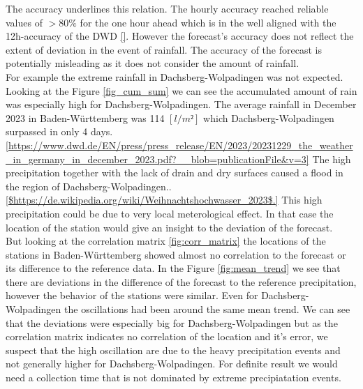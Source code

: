 \documentclass{article}
\theoremstyle{plain}
\theoremstyle{definition}
\theoremstyle{remark}
\begin{document}
The accuracy underlines this relation.
The hourly accuracy reached reliable values of $>80\%$ for the one hour ahead
which is in the well aligned with the 12h-accuracy of the DWD \ref{}. However
the forecast's accuracy does not reflect the extent of deviation in the event
of rainfall. The accuracy of the forecast is potentially misleading as it does
not consider the amount of rainfall. \\
For example the extreme rainfall in Dachsberg-Wolpadingen was not expected.
Looking at the Figure \ref{fig_cum_sum} we can see the accumulated amount of
rain was especially high for Dachsberg-Wolpadingen. The average rainfall in
December 2023 in Baden-Württemberg was 114 $[l/m²]$ which Dachsberg-Wolpadingen
surpassed in only 4
days.\ref{https://www.dwd.de/EN/press/press_release/EN/2023/20231229_the_weather_in_germany_in_december_2023.pdf?__blob=publicationFile&v=3}
The high precipitation together with the lack of drain and dry surfaces caused
a flood in the region of
Dachsberg-Wolpadingen..\ref{$https://de.wikipedia.org/wiki/Weihnachtshochwasser_2023$.}
This high precipitation could be due to very local meterological effect. In
that case the location of the station would give an insight to the deviation of
the forecast.\\

But looking at the correlation matrix \ref{fig:corr_matrix} the locations of
the stations in Baden-Württemberg showed almost no correlation to the forecast
or its difference to the reference data.
In the Figure \ref{fig:mean_trend} we see that there are deviations in the
difference of the forecast to the reference precipitation, however the behavior
of the stations were similar.
Even for Dachsberg-Wolpadingen the oscillations had been around the same mean
trend.	%
We can see that the deviations were especially big for Dachsberg-Wolpadingen
but as the correlation matrix indicates no correlation of the location and it's
error, we suspect that the high oscillation are due to the heavy precipitation
events and not generally higher for Dachsberg-Wolpadingen. For definite result
we would need a collection time that is not dominated by extreme precipiatation
events.\\  %
\end{document}
